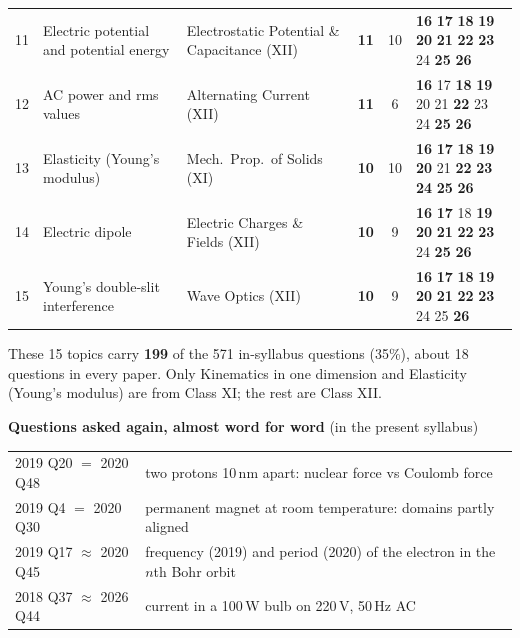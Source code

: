 {\begin{tabularx}{\linewidth}{@{}r@{\hspace{6pt}}>{\raggedright\arraybackslash}Xlcc@{\hspace{6pt}}l@{}}
11 & Electric potential and potential energy & Electrostatic Potential \& Capacitance (XII) & \textbf{11} & 10 & {\scriptsize \textbf{16} \textbf{17} \textbf{18} \textbf{19} \textbf{20} \textbf{21} \textbf{22} \textbf{23} {\color{gray!45}24} \textbf{25} \textbf{26}}\\
12 & AC power and rms values & Alternating Current (XII) & \textbf{11} & 6 & {\scriptsize \textbf{16} {\color{gray!45}17} \textbf{18} \textbf{19} {\color{gray!45}20} {\color{gray!45}21} \textbf{22} {\color{gray!45}23} {\color{gray!45}24} \textbf{25} \textbf{26}}\\
13 & Elasticity (Young's modulus) & Mech.\ Prop.\ of Solids (XI) & \textbf{10} & 10 & {\scriptsize \textbf{16} \textbf{17} \textbf{18} \textbf{19} \textbf{20} {\color{gray!45}21} \textbf{22} \textbf{23} \textbf{24} \textbf{25} \textbf{26}}\\
14 & Electric dipole & Electric Charges \& Fields (XII) & \textbf{10} & 9 & {\scriptsize \textbf{16} \textbf{17} {\color{gray!45}18} \textbf{19} \textbf{20} \textbf{21} \textbf{22} \textbf{23} {\color{gray!45}24} \textbf{25} \textbf{26}}\\
15 & Young's double-slit interference & Wave Optics (XII) & \textbf{10} & 9 & {\scriptsize \textbf{16} \textbf{17} \textbf{18} \textbf{19} \textbf{20} \textbf{21} \textbf{22} \textbf{23} {\color{gray!45}24} {\color{gray!45}25} \textbf{26}}\\
\bottomrule\end{tabularx}}\par\medskip
{\small These 15 topics carry \textbf{199} of the 571 in-syllabus questions (35\%), about 18 questions in every paper. Only Kinematics in one dimension and Elasticity (Young's modulus) are from Class XI; the rest are Class XII.}\par\medskip
{\small\textbf{\color{crimson}Questions asked again, almost word for word} (in the present syllabus)\par\smallskip
\begin{tabular}{@{}ll@{}}
2019 Q20 $=$ 2020 Q48 & two protons 10\,nm apart: nuclear force vs Coulomb force\\
2019 Q4 $=$ 2020 Q30 & permanent magnet at room temperature: domains partly aligned\\
2019 Q17 $\approx$ 2020 Q45 & frequency (2019) and period (2020) of the electron in the $n$th Bohr orbit\\
2018 Q37 $\approx$ 2026 Q44 & current in a 100\,W bulb on 220\,V, 50\,Hz AC\\
\end{tabular}}\par


